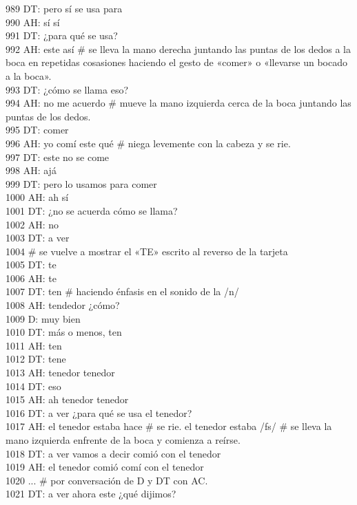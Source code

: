 989 DT: pero sí se usa para\\
990 AH: sí sí\\
991 DT: ¿para qué se usa?\\
992 AH: este así # se lleva la mano derecha juntando las puntas de los dedos a la boca en repetidas cosasiones haciendo el gesto de «comer» o «llevarse un bocado a la boca».\\
993 DT: ¿cómo se llama eso?\\
994 AH: no me acuerdo # mueve la mano izquierda cerca de la boca juntando las puntas de los dedos.\\
995 DT: comer\\
996 AH: yo comí este qué # niega levemente con la cabeza y se rie.\\
997 DT: este no se come\\
998 AH: ajá\\
999 DT: pero lo usamos para comer\\
1000 AH: ah sí\\
1001 DT: ¿no se acuerda cómo se llama?\\
1002 AH: no\\
1003 DT: a ver\\
1004 # se vuelve a mostrar el «TE» escrito al reverso de la tarjeta\\
1005 DT: te\\
1006 AH: te\\
1007 DT: ten # haciendo énfasis en el sonido de la /n/\\
1008 AH: tendedor ¿cómo?\\
1009 D: muy bien\\
1010 DT: más o menos, ten\\
1011 AH: ten\\
1012 DT: tene\\
1013 AH: tenedor tenedor\\
1014 DT: eso\\
1015 AH: ah tenedor tenedor \\
1016 DT: a ver ¿para qué se usa el tenedor?\\
1017 AH: el tenedor estaba hace # se rie. el tenedor estaba /fs/ # se lleva la mano izquierda enfrente de la boca y comienza a reírse.\\
1018 DT: a ver vamos a decir comió con el tenedor\\
1019 AH: el tenedor comió comí con el tenedor\\
1020 ... # por conversación de D y DT con AC.\\
1021 DT: a ver ahora este ¿qué dijimos?\\
